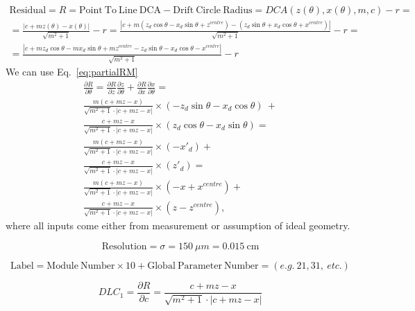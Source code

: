 \documentclass[a4paper,11pt]{article}
\begin{document}
\begin{equation}
\begin{split}
\mathrm{Residual}= R =\mathrm{Point \ To \ Line \ DCA} - \mathrm{Drift \ Circle \ Radius} = DCA(z(\theta),x(\theta),m,c) - r = \\
= \frac{ |c+mz(\theta)-x(\theta)| }  { \sqrt{m^2+1} } -r = \frac{ |c+m(z_d\cos \theta -x_d\sin \theta + z^{centre})-(z_d\sin \theta +x_d\cos \theta + x^{centre})| }  { \sqrt{m^2+1} } -r=\\ = \frac{ |c+mz_d\cos \theta -mx_d\sin \theta + mz^{centre} -z_d\sin \theta - x_d\cos \theta - x^{centre}| }  { \sqrt{m^2+1} } -r
\end{split}
\end{equation}
We can use Eq.~\ref{eq:partialRM}
\begin{equation}
\begin{split}
\frac{\partial R}{\partial\theta} = \frac{\partial R}{\partial z}\frac{\partial z}{\partial \theta} + \frac{\partial R}{\partial x}\frac{\partial x}{\partial \theta} = \\ \frac{ m(c+mz-x) }  { \sqrt{m^2+1} \cdot |c+mz-x| } \times (-z_d\sin \theta - x_d\cos \theta) \ + \\ \frac{ c+mz-x }  { \sqrt{m^2+1} \cdot |c+mz-x| } \times (z_d\cos \theta - x_d\sin \theta) = \\
\frac{ m(c+mz-x) }  { \sqrt{m^2+1} \cdot |c+mz-x| } \times (-x'_d) + \\ \frac{ c+mz-x }  { \sqrt{m^2+1} \cdot |c+mz-x| } \times (z'_d) = \\
\frac{ m(c+mz-x) }  { \sqrt{m^2+1} \cdot |c+mz-x| } \times (-x + x^{centre}) + \\ \frac{ c+mz-x }  { \sqrt{m^2+1} \cdot |c+mz-x| } \times (z - z^{centre}),
\end{split}
\end{equation}
where all inputs come either from measurement or assumption of ideal geometry. 


\begin{equation}	
\mathrm{Resolution} = \sigma = 150 \ \mu m = 0.015 \ \mathrm{cm}
\end{equation}

\begin{equation}	
\mathrm{Label}= \mathrm{Module \ Number} \times 10 + \mathrm{Global \ Parameter \ Number} = (e.g. \ 21, 31, \ etc.) 
\end{equation}

\begin{equation}
DLC_1 = \frac{\partial R}{\partial c} = \frac{ c+mz-x }  { \sqrt{m^2+1} \cdot |c+mz-x| }
\end{equation}
\end{document}
